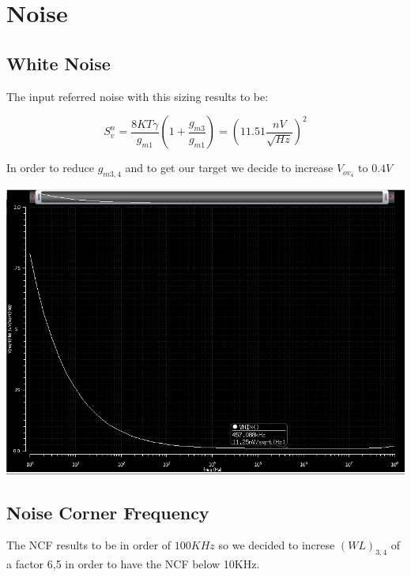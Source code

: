 
\section{Noise} %
\label{sec:noise}


\subsection{White Noise} %
\label{ssub:white_noise}


The input referred noise with this sizing results to be:

\begin{equation}
  S_v^n= \frac{8KT\gamma}{g_{m1}}(1+\frac{g_ {m3}}{g_{m1}}) = (11.51 \frac{nV}{\sqrt{Hz}})^2
\end{equation}

In order to reduce $g_{m3,4}$ and to get our target we decide to increase $V_{ov_4}$ to $0.4V$

\centering
\includegraphics[width=1\textwidth]{Capitoli/wn1st.png}
\raggedright



\subsection{Noise Corner Frequency} %
\label{ssub:noise_corner_frequency}

The NCF results to be in order of $100KHz$ so we decided to increse $(WL)_{3,4}$ of a factor 6,5 in order to have the NCF below 10KHz.


